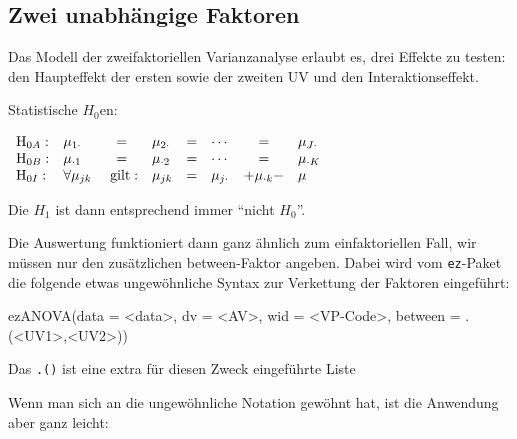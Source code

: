 \documentclass[
]{book}
\newenvironment{Shaded}{\begin{snugshade}}{\end{snugshade}}
\newcommand{\AttributeTok}[1]{\textcolor[rgb]{0.77,0.63,0.00}{#1}}
\newcommand{\FunctionTok}[1]{\textcolor[rgb]{0.00,0.00,0.00}{#1}}
\newcommand{\NormalTok}[1]{#1}
\newcommand{\SpecialCharTok}[1]{\textcolor[rgb]{0.00,0.00,0.00}{#1}}
\begin{document}
\hypertarget{zwei-unabhuxe4ngige-faktoren}{%
\subsection{Zwei unabhängige Faktoren}\label{zwei-unabhuxe4ngige-faktoren}}

Das Modell der zweifaktoriellen Varianzanalyse erlaubt es, drei Effekte zu testen: den Haupteffekt der ersten sowie der zweiten UV und den Interaktionseffekt.

Statistische \(H_0\)en:

\(\begin{array}{l l c l c l c l} \text{H}_{0A}: & \mu_{1\cdot} & = & \mu_{2\cdot} & = & \cdots & = & \mu_{J\cdot} \\ \text{H}_{0B}: & \mu_{\cdot 1} & = & \mu_{\cdot 2} & = & \cdots & = & \mu_{\cdot K} \\ \text{H}_{0I}: & \forall {\mu}_{jk} & \text{ gilt}: &{\mu}_{jk} & = & {\mu}_{j\cdot}& + {\mu}_{\cdot k} -& \mu \end{array}\)

Die \(H_1\) ist dann entsprechend immer ``nicht \(H_0\)''.

Die Auswertung funktioniert dann ganz ähnlich zum einfaktoriellen Fall, wir müssen nur den zusätzlichen between-Faktor angeben. Dabei wird vom \texttt{ez}-Paket die folgende etwas ungewöhnliche Syntax zur Verkettung der Faktoren eingeführt:

\begin{Shaded}
\begin{Highlighting}[]
\FunctionTok{ezANOVA}\NormalTok{(}\AttributeTok{data =} \SpecialCharTok{\textless{}}\NormalTok{data}\SpecialCharTok{\textgreater{}}\NormalTok{, }
        \AttributeTok{dv =} \SpecialCharTok{\textless{}}\NormalTok{AV}\SpecialCharTok{\textgreater{}}\NormalTok{, }
        \AttributeTok{wid =} \SpecialCharTok{\textless{}}\NormalTok{VP}\SpecialCharTok{{-}}\NormalTok{Code}\SpecialCharTok{\textgreater{}}\NormalTok{,}
        \AttributeTok{between =}\NormalTok{ .(}\SpecialCharTok{\textless{}}\NormalTok{UV1}\SpecialCharTok{\textgreater{}}\NormalTok{,}\SpecialCharTok{\textless{}}\NormalTok{UV2}\SpecialCharTok{\textgreater{}}\NormalTok{))}
\end{Highlighting}
\end{Shaded}

Das \texttt{.()} ist eine extra für diesen Zweck eingeführte Liste

Wenn man sich an die ungewöhnliche Notation gewöhnt hat, ist die Anwendung aber ganz leicht:
\end{document}
